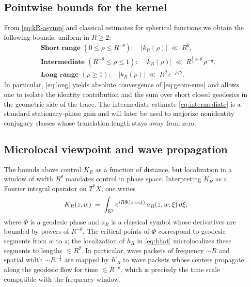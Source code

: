 \subsection{Pointwise bounds for the kernel}\label{subsec:kernel-estimates}
From \eqref{eq:kR-asymp} and classical estimates for spherical functions we obtain the following bounds, uniform in $R\ge 2$:
\begin{align}
&\textbf{Short range } (0\le \rho \le R^{-\theta})\!:\quad
|k_R(\rho)| \;\ll\; R^\theta, \label{eq:short}\\[3pt]
&\textbf{Intermediate } (R^{-\theta}\le \rho \le 1)\!:\quad
|k_R(\rho)| \;\ll\; R^{\tfrac12+\theta}\,\rho^{-\tfrac12}, \label{eq:intermediate}\\[3pt]
&\textbf{Long range } (\rho\ge 1)\!:\quad
|k_R(\rho)| \;\ll\; R^\theta\, e^{-\rho/2}. \label{eq:long}
\end{align}
In particular, \eqref{eq:long} yields absolute convergence of \eqref{eq:geom-sum} and allows one to isolate the identity contribution and the sum over short closed geodesics in the geometric side of the trace. The intermediate estimate \eqref{eq:intermediate} is a standard stationary-phase gain and will later be used to majorize nonidentity conjugacy classes whose translation length stays away from zero.

\subsection{Microlocal viewpoint and wave propagation}\label{subsec:microlocal-perspective}
The bounds above control $K_R$ as a function of distance, but localization in a window of width $R^\theta$ mandates control in phase space. Interpreting $K_R$ as a Fourier integral operator on $T^*X$, one writes
\[
K_R(z,w) \;=\; \int_{\mathbb{R}^2} e^{i R \Phi(z,w,\xi)}\, a_R(z,w,\xi)\, d\xi,
\]
where $\Phi$ is a geodesic phase and $a_R$ is a classical symbol whose derivatives are bounded by powers of $R^{-\theta}$. The critical points of $\Phi$ correspond to geodesic segments from $w$ to $z$; the localization of $\widehat{h}_R$ in \eqref{eq:hhat} microlocalizes these segments to lengths $\lesssim R^\theta$. In particular, wave packets of frequency $\sim R$ and spatial width $\sim R^{-\tfrac12}$ are mapped by $K_R$ to wave packets whose centers propagate along the geodesic flow for time $\lesssim R^{-\theta}$, which is precisely the time scale compatible with the frequency window.

